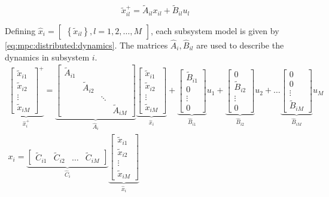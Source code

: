 \documentclass[10pt]{article}
\newcommand{\set}[1]{\left\lbrace #1 \right\rbrace}
\theoremstyle{definition}
\begin{document}
\begin{equation}
\label{eq:substate}
 \tilde{x}_{il}^+  = \tilde{A}_{il} x_{il}  + \tilde{B}_{il} u_l
\end{equation}

Defining $\hat{x}_i = \begin{bmatrix} \set{\tilde{x}_{il}}, l =
  {1,2,\ldots,M}\end{bmatrix}$, each subsystem model is given by
  \eqref{eq:mpc:distributed:dynamics}. The matrices
  $\hat{A}_i,\hat{B}_{il}$ are used to describe the dynamics in
  subsystem $i$.
\begin{gather}
\underbrace{\begin{bmatrix} \tilde{x}_{i1}\\\tilde{x}_{i2} \\\vdots\\\tilde{x}_{iM}\end{bmatrix}^+}_{\hat{x}_i^+} =
 \underbrace{\begin{bmatrix} \tilde{A}_{i1} &  & & \\
  & \tilde{A}_{i2}& & \\
  & & \ddots & \\ & & &\tilde{A}_{iM} \end{bmatrix}
 }_{\hat{A}_i}
 \underbrace{\begin{bmatrix} \tilde{x}_{i1}\\
 \tilde{x}_{i2} \\
 \vdots\\
 \tilde{x}_{iM}
 \end{bmatrix}}_{\hat{x}_i}+
 \underbrace{\begin{bmatrix}\tilde{B}_{i1}\\0\\\vdots\\0\end{bmatrix}}_{\hat{B}_{i1}}u_1
 +
 \underbrace{\begin{bmatrix}0\\\tilde{B}_{i2}\\\vdots\\0\end{bmatrix}}_{\hat{B}_{i2}}u_2
 + \ldots
 \underbrace{\begin{bmatrix}0\\0\\\vdots\\\tilde{B}_{iM}\end{bmatrix}}_{\hat{B}_{iM}}u_M
 \label{eq:mpc:distributed:subsystem}
\\
x_i = \underbrace{\begin{bmatrix} \tilde{C}_{i1} & \tilde{C}_{i2} & \ldots & \tilde{C}_{iM}\end{bmatrix}}_{\hat{C}_i}\underbrace{\begin{bmatrix} \tilde{x}_{i1}\\
\tilde{x}_{i2} \\
\vdots\\
\tilde{x}_{iM} \end{bmatrix}}_{\hat{x}_i}
\end{gather}
\end{document}
